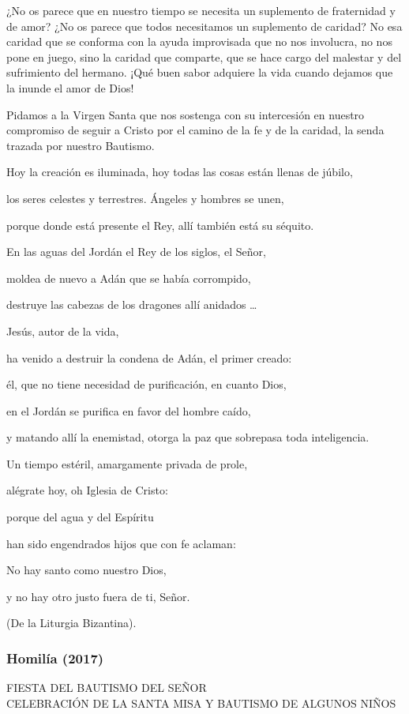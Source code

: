 \begin{body}
\begin{body}
{¿No os parece que en nuestro tiempo se necesita un suplemento de fraternidad y de amor? ¿No os parece que todos necesitamos un suplemento de caridad? No esa caridad que se conforma con la ayuda improvisada que no nos involucra, no nos pone en juego, sino la caridad que comparte, que se hace cargo del malestar y del sufrimiento del hermano. ¡Qué buen sabor adquiere la vida cuando dejamos que la inunde el amor de Dios!

Pidamos a la Virgen Santa que nos sostenga con su intercesión en nuestro compromiso de seguir a Cristo por el camino de la fe y de la caridad, la senda trazada por nuestro Bautismo.

Hoy la creación es iluminada, hoy todas las cosas están llenas de júbilo,

los seres celestes y terrestres. Ángeles y hombres se unen,

porque donde está presente el Rey, allí también está su séquito.

En las aguas del Jordán el Rey de los siglos, el Señor,

moldea de nuevo a Adán que se había corrompido,

destruye las cabezas de los dragones allí anidados \ldots{}

Jesús, autor de la vida,

ha venido a destruir la condena de Adán, el primer creado:

él, que no tiene necesidad de purificación, en cuanto Dios,

en el Jordán se purifica en favor del hombre caído,

y matando allí la enemistad, otorga la paz que sobrepasa toda inteligencia.

Un tiempo estéril, amargamente privada de prole,

alégrate hoy, oh Iglesia de Cristo:

porque del agua y del Espíritu

han sido engendrados hijos que con fe aclaman:

No hay santo como nuestro Dios,

y no hay otro justo fuera de ti, Señor.

(De la Liturgia Bizantina).

\subsubsection{Homilía (2017)} FIESTA DEL BAUTISMO DEL SEÑOR\\ CELEBRACIÓN DE LA SANTA MISA Y BAUTISMO DE ALGUNOS NIÑOS

}
\end{body}
\end{body}

